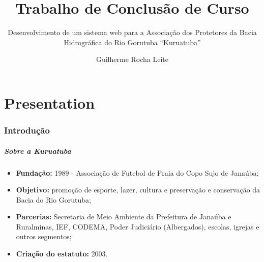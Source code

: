 \documentclass[xcolor=table]{beamer}
\title[Trabalho de Conclusão de Curso]{Trabalho de Conclusão de Curso}
\subtitle{Desenvolvimento de um sistema web para a Associação dos Protetores da Bacia Hidrográfica do Rio Gorutuba ``Kuruatuba''}
\author[Guilherme Rocha Leite]{Guilherme Rocha Leite}
\institute[UFVJM]{Universidade Federal dos Vales do Jequitinhonha e Mucuri \newline
  Bacharelado em Sistemas de Informação \newline
	  
     Orientador: Prof. Erinaldo Barbosa da Silva\\
     Coorientador: Thales Francisco Mota Carvalho\\
     $~$\\
}
\begin{document}
\frame{\titlepage}

\part{Presentation}




\section{Introdução}

\begin{frame}
    \frametitle{Sobre a Kuruatuba}
    \begin{itemize}
        \item \textbf{Fundação:} 1989 - Associação de Futebol de Praia do Copo Sujo de Janaúba;
        \item \textbf{Objetivo:} promoção de esporte, lazer, cultura e preservação e conservação da Bacia do Rio Gorutuba;
        \item \textbf{Parcerias:} Secretaria de Meio Ambiente da Prefeitura de Janaúba e Ruralminas, IEF, CODEMA, Poder Judiciário (Albergados), escolas, igrejas e outros segmentos;
        \item \textbf{Criação do estatuto:} 2003.
    \end{itemize}

\end{frame}
\end{document}
